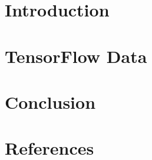 \section[Intro]{Introduction}


\section[TfData]{TensorFlow Data}


\section[End]{Conclusion}



\section[Refs]{References}


